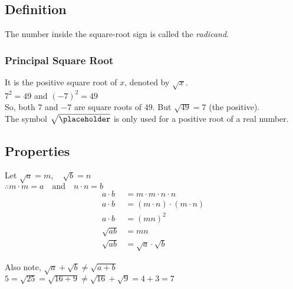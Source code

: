 \documentclass{hw}
\begin{document}
\subsection*{\normalsize Definition}

The number inside the square-root sign is called the \textit{radicand}.

\subsubsection*{\normalsize Principal Square Root}
It is the positive square root of $x$, denoted by $\sqrt{x}$. \\
$7^2 = 49$ \quad and \quad $(-7)^2 = 49$ \\
So, both $7$ and $-7$ are square roots of $49$. But $\sqrt{49} = 7$ (the positive).\\
The symbol $\sqrt{\placeholder}$ is only used for a positive root of a real number.

\subsection*{\normalsize Properties}
{\centering
{}\par}

Let $\sqrt{a} = m, \quad \sqrt{b} = n$ \\
$\therefore m \cdot m = a \quad \text{and} \quad n \cdot n = b $
\begin{align*}
a \cdot b &= m \cdot m \cdot n \cdot n \\
a \cdot b &= (m \cdot n) \cdot (m \cdot n) \\
a \cdot b &= (m n)^2 \\
\sqrt{a b} &= m n \\
\sqrt{a b} &= \sqrt{a} \cdot \sqrt{b}
\end{align*}

Also note,
$\sqrt{a} + \sqrt{b} \neq \sqrt{a + b}$ \\
$5 = \sqrt{25} = \sqrt{16 + 9} \neq \sqrt{16} + \sqrt{9} = 4 + 3 = 7$
\end{document}
